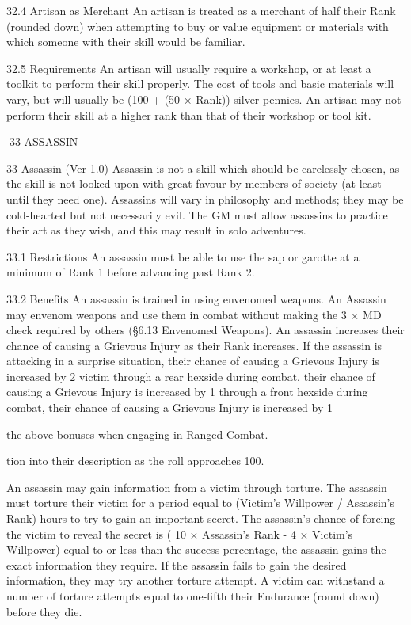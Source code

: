 \documentclass[a4paper]{article}
\begin{document}
\begin{multicols}{3}
32.4 Artisan as Merchant
An artisan is treated as a merchant of half their
Rank (rounded down) when attempting to buy or
value equipment or materials with which someone
with their skill would be familiar.

32.5 Requirements
An artisan will usually require a workshop, or at
least a toolkit to perform their skill properly. The
cost of tools and basic materials will vary, but will
usually be (100 + (50 × Rank)) silver pennies. An
artisan may not perform their skill at a higher rank
than that of their workshop or tool kit.

33 ASSASSIN

33 Assassin (Ver 1.0)
Assassin is not a skill which should be carelessly
chosen, as the skill is not looked upon with great
favour by members of society (at least until they
need one). Assassins will vary in philosophy and
methods; they may be cold-hearted but not necessarily evil. The GM must allow assassins to practice their art as they wish, and this may result in
solo adventures.

33.1 Restrictions
An assassin must be able to use the sap or garotte at a minimum of Rank 1 before advancing
past Rank 2.

33.2 Benefits
An assassin is trained in using envenomed
weapons.
An Assassin may envenom weapons and use them
in combat without making the 3 × MD check required by others (§6.13 Envenomed Weapons).
An assassin increases their chance of causing a
Grievous Injury as their Rank increases.
If the assassin is attacking in a surprise situation,
their chance of causing a Grievous Injury is increased by 2%
victim through a rear hexside during combat, their
chance of causing a Grievous Injury is increased by
1%
through a front hexside during combat, their
chance of causing a Grievous Injury is increased by
1%

the above bonuses when engaging in Ranged
Combat.

tion into their description as the roll approaches
100.

An assassin may gain information from a victim
through torture.
The assassin must torture their victim for a period
equal to (Victim’s Willpower / Assassin’s Rank)
hours to try to gain an important secret. The assassin’s chance of forcing the victim to reveal the
secret is ( 10 × Assassin’s Rank - 4 × Victim’s
Willpower)%
equal to or less than the success percentage, the
assassin gains the exact information they require. If
the assassin fails to gain the desired information,
they may try another torture attempt. A victim can
withstand a number of torture attempts equal to
one-fifth their Endurance (round down) before they
die.


\end{multicols}
\end{document}
